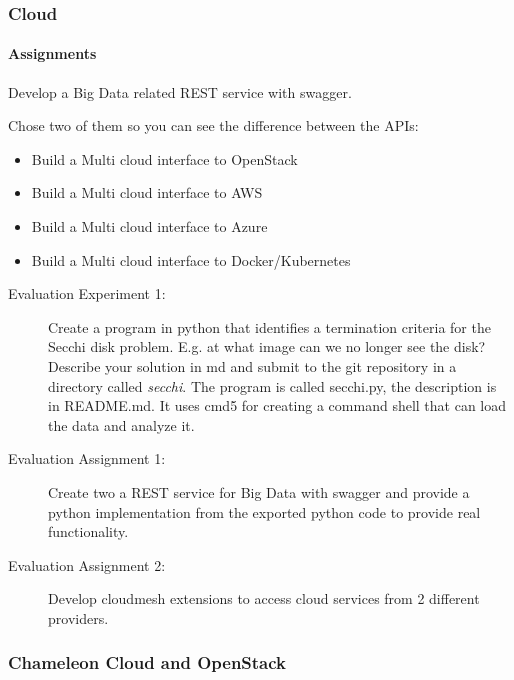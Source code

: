 
\subsubsection{Cloud}



\paragraph{Assignments}

Develop a Big Data related REST service with swagger.

Chose two of them so you can see the difference between the APIs:

\begin{itemize}
\item Build a Multi cloud interface to OpenStack
\item Build a Multi cloud interface to AWS
\item Build a Multi cloud interface to Azure
\item Build a Multi cloud interface to Docker/Kubernetes
\end{itemize}


\begin{description}
\item[Evaluation Experiment 1:] Create a program in python that
  identifies a termination criteria for the Secchi disk
  problem. E.g. at what image can we no longer see the disk?
  Describe your solution in md and submit to the git repository in a
  directory called {\em secchi}. The program is called secchi.py, the
  description is in README.md. It uses cmd5 for creating a command
  shell that can load the data and analyze it. 
\item[Evaluation Assignment 1:] Create two a REST service for Big Data
  with swagger and provide a python implementation from the exported
  python code to provide real functionality.
\item[Evaluation Assignment 2:] Develop cloudmesh extensions to access
  cloud services from 2 different providers.
\end{description}

\subsubsection{Chameleon Cloud and OpenStack}

